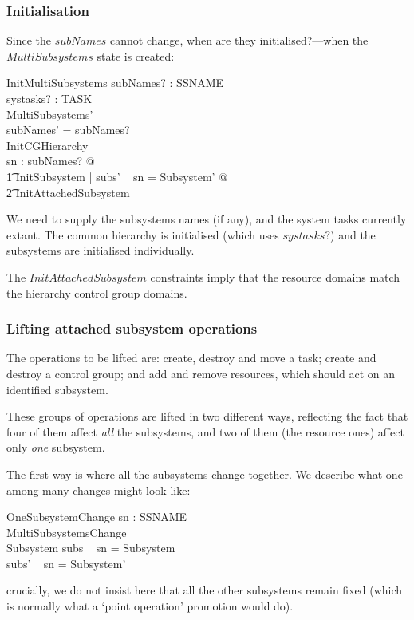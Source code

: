 \documentclass[a4paper,twoside,12pt]{article}
\begin{document}
\subsubsection{Initialisation}

Since the $subNames$ cannot change, when are they initialised?---when the $MultiSubsystems$ state is created:

\begin{schema}{InitMultiSubsystems}
subNames? : \finset SSNAME \\
systasks? : \finset TASK \\
MultiSubsystems' \\
\where
subNames' = subNames? \\
InitCGHierarchy \\
\forall sn : subNames? @ \\
	\t1 \exists InitSubsystem | subs' ~ sn = \theta Subsystem' @ \\
		\t2 InitAttachedSubsystem 
\end{schema}
We need to supply the subsystems names (if any), and the system tasks currently extant. 
The common hierarchy is initialised (which uses $systasks?$)
and the subsystems are 
initialised individually. 

The $InitAttachedSubsystem$ constraints imply that the resource domains match the hierarchy control group
domains.

\subsubsection{Lifting attached subsystem operations}

The operations to be lifted are: create,  destroy and move a task;
create and destroy a control group; and add and remove resources, which should act on an
identified subsystem.

These groups of operations are lifted in two different ways, reflecting the fact that four of them
affect \emph{all} the subsystems, and two of them (the resource ones) affect only \emph{one} subsystem.

The first way is where all the subsystems change together. We describe what one among many changes might look like:
\begin{schema}{OneSubsystemChange}
sn : SSNAME \\
MultiSubsystemsChange \\
\Delta Subsystem
\where
subs ~ sn = \theta Subsystem \\
subs' ~ sn = \theta Subsystem'
\end{schema}
crucially, we do not insist here that all the other subsystems remain fixed 
(which is normally what a `point operation' promotion would do).
\end{document}
